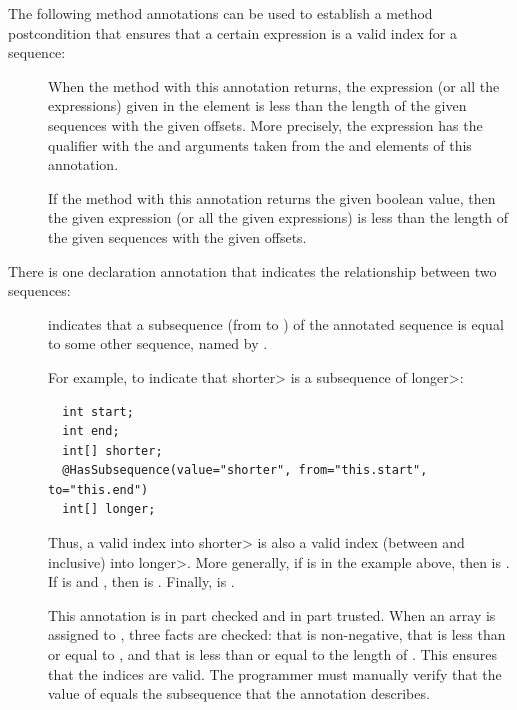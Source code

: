 The following method annotations can be used to establish a method postcondition
that ensures that a certain expression is a valid index for a sequence:

\begin{description}
\item[]
  When the method with this annotation returns, the expression (or all the expressions) given in the  element
  is less than the length of the given sequences with the given offsets. More precisely, the expression
  has the  qualifier with the  and  arguments
  taken from the  and  elements of this annotation.
\item[]
  If the method with this annotation returns the given boolean value,
  then the given expression (or all the given expressions)
  is less than the length of the given sequences with the given offsets.
\end{description}

There is one declaration annotation that indicates the relationship between
two sequences:

\begin{description}
\item[]
  indicates that a subsequence (from  to ) of the
  annotated sequence is equal to some other sequence, named by
  .

For example, to indicate that \<shorter> is a subsequence of \<longer>:

\begin{Verbatim}
  int start;
  int end;
  int[] shorter;
  @HasSubsequence(value="shorter", from="this.start", to="this.end")
  int[] longer;
\end{Verbatim}

Thus, a valid index into \<shorter> is also a valid index (between
 and  inclusive) into \<longer>.  More generally,
if  is  in the example above, then
 is . If  is
 and , then  is . Finally,  is
.

This annotation is in part checked and in part trusted.  When an array is
assigned to , three facts are checked: that  is
non-negative, that  is less than or equal to , and
that  is less than or equal to the length of .  This
ensures that the indices are valid. The programmer must manually verify
that the value of  equals the subsequence that the annotation describes.
\end{description}


